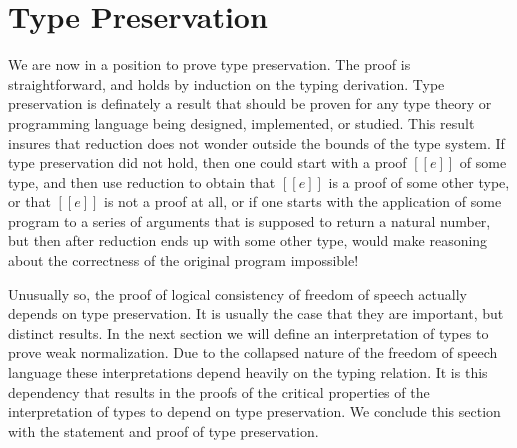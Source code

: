 \section{Type Preservation}
\label{sec:type_preservation}
We are now in a position to prove type preservation.  The proof is
straightforward, and holds by induction on the typing derivation.
Type preservation is definately a result that should be proven for any
type theory or programming language being designed, implemented, or
studied.  This result insures that reduction does not wonder outside
the bounds of the type system.  If type preservation did not hold,
then one could start with a proof $[[e]]$ of some type, and then use
reduction to obtain that $[[e]]$ is a proof of some other type, or that
$[[e]]$ is not a proof at all, or if one starts with the application
of some program to a series of arguments that is supposed to return a
natural number, but then after reduction ends up with some other type,
would make reasoning about the correctness of the original program
impossible!

Unusually so, the proof of logical consistency of freedom of speech
actually depends on type preservation.  It is usually the case that
they are important, but distinct results.  In the next section we will
define an interpretation of types to prove weak normalization.  Due to
the collapsed nature of the freedom of speech language these
interpretations depend heavily on the typing relation. It is this
dependency that results in the proofs of the critical properties of
the interpretation of types to depend on type preservation.  We
conclude this section with the statement and proof of type
preservation.
 
